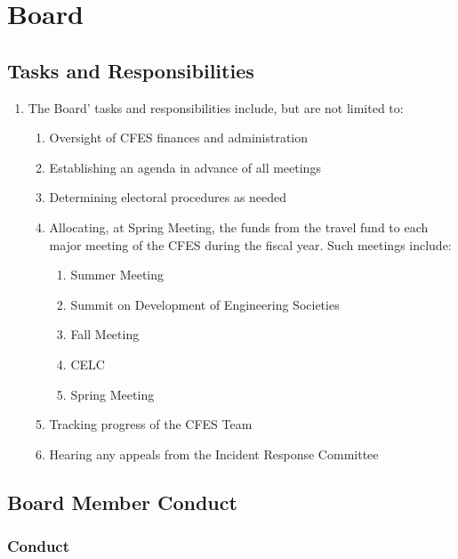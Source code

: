 \section{Board}
\label{board}

\subsection{Tasks and Responsibilities}
\label{tasks-and-responsibilities}

\begin{enumerate}
 \item
  The Board' tasks and responsibilities include, but are not limited to:

  \begin{enumerate}
   \item
    Oversight of CFES finances and administration
   \item
    Establishing an agenda in advance of all meetings
   \item
    Determining electoral procedures as needed
   \item
    Allocating, at Spring Meeting, the funds from the travel fund to each major meeting of the CFES during the fiscal year. Such meetings include:

    \begin{enumerate}
     \item
      Summer Meeting
     \item
      Summit on Development of Engineering Societies
     \item
      Fall Meeting
     \item
      CELC
     \item
      Spring Meeting
    \end{enumerate}

   \item
    Tracking progress of the CFES Team

   \item
    Hearing any appeals from the Incident Response Committee
  \end{enumerate}
\end{enumerate}

\subsection{Board Member Conduct}
\label{board-member-conduct}

\subsubsection{Conduct}
\label{conduct}

